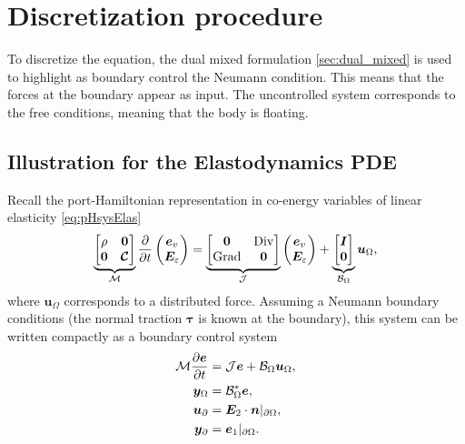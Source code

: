 \section{Discretization procedure}
\label{sec:MB_discr}
To discretize the equation, the dual mixed formulation \ref{sec:dual_mixed} is used to highlight as boundary control the Neumann condition. This means that the forces at the boundary appear as input. The uncontrolled system corresponds to the free conditions, meaning that the body is floating.

\subsection{Illustration for the Elastodynamics PDE}
Recall the port-Hamiltonian representation in co-energy variables of linear elasticity \ref{eq:pHsysElas}
\begin{equation*}
\underbrace{\begin{bmatrix}
	\rho & \bm{0} \\ \bm{0} & \bm{\mathcal{C}} \\
	\end{bmatrix}}_{\mathcal{M}}
\diffp{}{t}
\begin{pmatrix}
\bm{e}_v \\ \bm{E}_\varepsilon \\
\end{pmatrix} = 
\underbrace{\begin{bmatrix}
	\bm{0} & \Div \\ \Grad & \bm{0} \\
	\end{bmatrix}}_{\mathcal{J}}
\begin{pmatrix}
\bm{e}_v \\ \bm{E}_\varepsilon \\
\end{pmatrix} + 
\underbrace{\begin{bmatrix}
	\bm{I} \\ \bm{0} \\
	\end{bmatrix}}_{\mathcal{B}_\Omega} \bm{u}_\Omega,
\end{equation*}
where $\bm{u}_\Omega$ corresponds to a distributed force. Assuming a Neumann boundary conditions (the normal traction $\bm\tau$ is known at the boundary), this system can be written compactly as a boundary control system
\begin{equation}
\label{eq:eldyn_PDE}
\begin{aligned}
\mathcal{M} \diffp{\bm{e}}{t} &= \mathcal{J} \bm{e} + \mathcal{B}_\Omega \bm{u}_\Omega, \\
\bm{y}_\Omega &= \mathcal{B}_\Omega^* \bm{e}, \\
\bm{u}_\partial &= \bm{E}_2 \cdot \bm{n}|_{\partial\Omega}, \\
\bm{y}_\partial &= \bm{e}_1|_{\partial\Omega}.
\end{aligned}
\end{equation}
